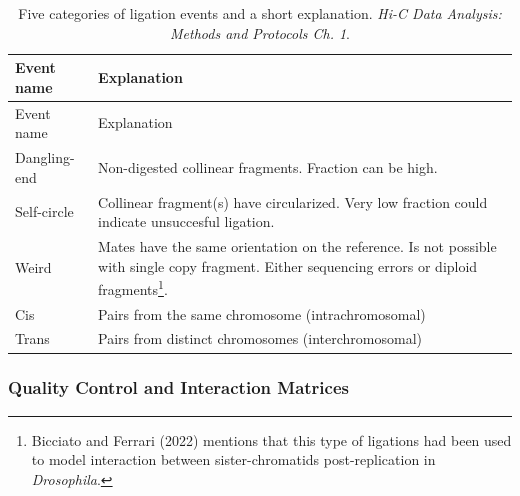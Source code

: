 \documentclass[
  11pt,
  a4paper,
]{scrbook}
\let\oldemph\emph
\renewcommand\emph[1]{\oldemph{\color{gray}#1}}
\begin{document}
\begin{longtable}[]{@{}
  >{\raggedright\arraybackslash}p{}
  >{\raggedright\arraybackslash}p{}@{}}
\caption{Five categories of ligation events and a short explanation.
\emph{Hi-C Data Analysis: Methods and Protocols Ch.
1}.}\label{tbl-ligation-events}\tabularnewline
\toprule\noalign{}
\begin{minipage}[b]{\linewidth}\raggedright
Event name
\end{minipage} & \begin{minipage}[b]{\linewidth}\raggedright
Explanation
\end{minipage} \\
\midrule\noalign{}
\endfirsthead
\toprule\noalign{}
\begin{minipage}[b]{\linewidth}\raggedright
Event name
\end{minipage} & \begin{minipage}[b]{\linewidth}\raggedright
Explanation
\end{minipage} \\
\midrule\noalign{}
\endhead
\bottomrule\noalign{}
\endlastfoot
Dangling-end & Non-digested collinear fragments. Fraction can be
high. \\
Self-circle & Collinear fragment(s) have circularized. Very low fraction
could indicate unsuccesful ligation. \\
Weird & Mates have the same orientation on the reference. Is not
possible with single copy fragment. Either sequencing errors or diploid
fragments\footnote{Bicciato and Ferrari (2022) mentions that this type
  of ligations had been used to model interaction between
  sister-chromatids post-replication in \emph{Drosophila}.}. \\
Cis & Pairs from the same chromosome (intrachromosomal) \\
Trans & Pairs from distinct chromosomes (interchromosomal) \\
\end{longtable}

\normalsize

\subsubsection{Quality Control and Interaction
Matrices}\label{sec-matrix-qc}
\end{document}
